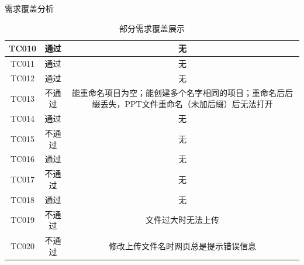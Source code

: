 \begin{frame}{需求覆盖分析}
\begin{table}[]
{\begin{tabular}{c|c|c}
                \hline
                TC010               & 通过              & 无                                                                                                \\
                \hline
                TC011               & 通过              & 无                                                                                                \\
                \hline
                TC012               & 通过              & 无                                                                                                \\
                \hline
                TC013               & 不通过            & 能重命名项目为空；能创建多个名字相同的项目；重命名后后缀丢失，PPT文件重命名（未加后缀）后无法打开 \\
                \hline
                TC014               & 通过              & 无                                                                                                \\
                \hline
                TC015               & 不通过            & 无                                                                                                \\
                \hline
                TC016               & 通过              & 无                                                                                                \\
                \hline
                TC017               & 不通过            & 无                                                                                                \\
                \hline
                TC018               & 通过              & 无                                                                                                \\
                \hline
                TC019               & 不通过            & 文件过大时无法上传                                                                                \\
                \hline
                TC020               & 不通过            & 修改上传文件名时网页总是提示错误信息                                                              \\
                \hline
            \end{tabular}
        }
        \caption{部分需求覆盖展示}
        \label{tab:tech-strategy}
    \end{table}
\end{frame}

